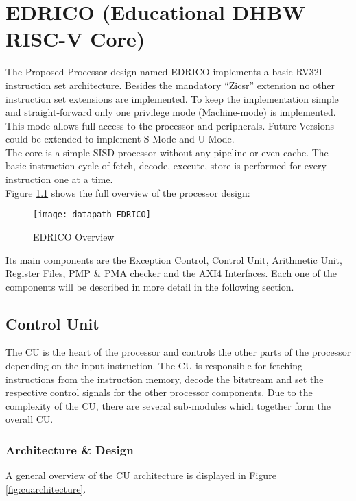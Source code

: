 
\chapter{EDRICO (Educational DHBW RISC-V Core)}

The Proposed Processor design named EDRICO implements a basic RV32I
instruction set architecture. Besides the mandatory “Zicsr” extension no other
instruction set extensions are implemented. To keep the implementation simple and
straight-forward only one privilege mode (Machine-mode) is implemented. This mode
allows full access to the processor and peripherals. Future Versions could be
extended to implement S-Mode and U-Mode.\\
The core is a simple \acf{SISD} processor without any pipeline or even cache. The basic instruction cycle of fetch, decode, execute, store is performed for every instruction one at a time.\\
Figure \ref{fig:edricooverview} shows the full overview of the processor design:

\begin{figure}[H]
	\centering
	\texttt{[image: datapath\_EDRICO]}
	\caption{EDRICO Overview}
	\label{fig:edricooverview}
\end{figure}

Its main components are the Exception Control, Control Unit, Arithmetic Unit,
Register Files, PMP \& PMA checker and the AXI4 Interfaces.
Each one of the components will be described in more detail in the following section.

\section{Control Unit}
The \ac{CU} is the heart of the processor and controls the other parts of the processor depending on the input instruction. The CU is responsible for fetching instructions from the instruction memory, decode the bitstream and set the respective control signals for the other processor components. Due to the complexity of the CU, there are several sub-modules which together form the overall CU.
\subsection{Architecture \& Design}
\label{CU_arch}
A general overview of the CU architecture is displayed in Figure \ref{fig:cuarchitecture}. 

